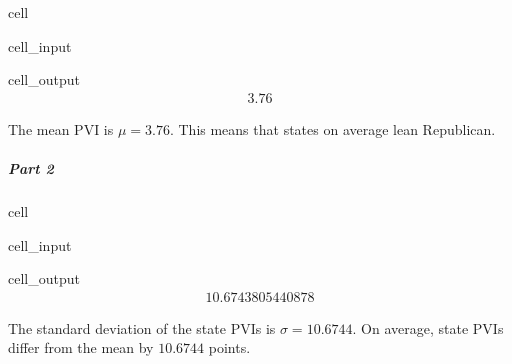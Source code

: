 \documentclass[letterpaper,10pt,english]{jupyterBook}
\begin{document}
\begin{sphinxuseclass}{cell}
\begin{sphinxVerbatimInput}
\begin{sphinxuseclass}{cell_input}
\end{sphinxuseclass}\end{sphinxVerbatimInput}
\begin{sphinxVerbatimOutput}

\begin{sphinxuseclass}{cell_output}\begin{equation*}
\begin{split}3.76\end{split}
\end{equation*}
\end{sphinxuseclass}\end{sphinxVerbatimOutput}

\end{sphinxuseclass}
\sphinxAtStartPar
The mean PVI is \(\mu = 3.76\). This means that states on average lean Republican.


\subparagraph{Part 2}
\label{\detokenize{Ch2 Descriptive Statistics/2.3 Measures of Dispersion:part-2}}
\begin{sphinxuseclass}{cell}\begin{sphinxVerbatimInput}

\begin{sphinxuseclass}{cell_input}
\begin{sphinxVerbatim}[commandchars=\\\{\}]
\end{sphinxVerbatim}

\end{sphinxuseclass}\end{sphinxVerbatimInput}
\begin{sphinxVerbatimOutput}

\begin{sphinxuseclass}{cell_output}\begin{equation*}
\begin{split}10.6743805440878\end{split}
\end{equation*}
\end{sphinxuseclass}\end{sphinxVerbatimOutput}

\end{sphinxuseclass}
\sphinxAtStartPar
The standard deviation of the state PVIs is \(\sigma = 10.6744\). On average, state PVIs differ from the mean by \(10.6744\) points.
\end{document}
